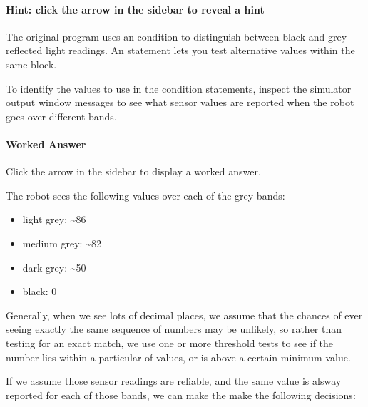 \documentclass[letterpaper,10pt,english]{sphinxmanual}
\begin{document}
\paragraph{Hint: click the arrow in the sidebar to reveal a hint}
\label{\detokenize{content/02_Robot_Lab/Section_00_02:Hint:-click-the-arrow-in-the-sidebar-to-reveal-a-hint}}
The original program uses an  condition to distinguish between black and grey reflected light readings. An  statement lets you test alternative values within the same  block.

To identify the values to use in the condition statements, inspect the simulator output window messages to see what sensor values are reported when the robot goes over different bands.


\paragraph{Worked Answer}
\label{\detokenize{content/02_Robot_Lab/Section_00_02:Worked-Answer}}
Click the arrow in the sidebar to display a worked answer.

The robot sees the following values over each of the grey bands:
\begin{itemize}
\item {} 
light grey: \textasciitilde{}86

\item {} 
medium grey: \textasciitilde{}82

\item {} 
dark grey: \textasciitilde{}50

\item {} 
black: 0

\end{itemize}

Generally, when we see lots of decimal places, we assume that the chances of ever seeing exactly the same sequence of numbers may be unlikely, so rather than testing for an exact match, we use one or more threshold tests to see if the number lies within a particular  of values, or is above a certain minimum value.

If we assume those sensor readings are reliable, and the same value is alsway reported for each of those bands, we can make the make the following decisions:
\end{document}

